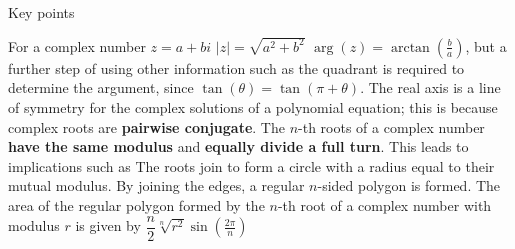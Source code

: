 \documentclass[11pt]{article}
\begin{document}
\noindent Key points
\begin{outline}[enumerate]
  \1 For a complex number $z = a + bi$
  \2 $|z| = \sqrt{a^2 + b^2}$
  \2 $\arg(z) = \arctan(\frac{b}{a})$, but a further step of using other information such as the quadrant is required to determine the argument, since $\tan(\theta) = \tan(\pi + \theta)$.
  \1 The real axis is a line of symmetry for the complex solutions of a polynomial equation; this is because complex roots are \textbf{pairwise conjugate}.
  \1 The $n$-th roots of a complex number \textbf{have the same modulus} and \textbf{equally divide a full turn}. This leads to implications such as
  \2 The roots join to form a circle with a radius equal to their mutual modulus.
  \2 By joining the edges, a regular $n$-sided polygon is formed.
  \2 The area of the regular polygon formed by the $n$-th root of a complex number with modulus $r$ is given by $\dfrac{n}{2}\sqrt[n]{r^2}\sin(\frac{2\pi}{n})$
\end{outline}
\end{document}

